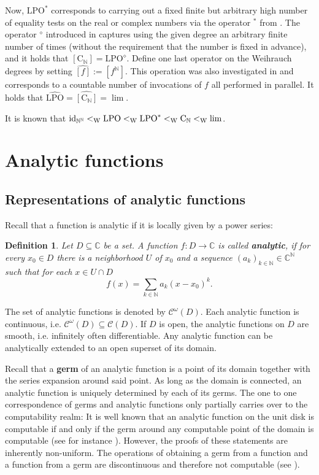 \documentclass{eptcs-modified}
\newtheorem{definition}[theorem]{Definition}
\newcommand{\Wd}[1]{\left[#1\right]}
\newcommand{\id}{\textnormal{id}}
\newcommand{\Baire}{{\mathbb{N}^\mathbb{N}}}
\newcommand{\lpo}{\textrm{LPO}}
\newcommand{\leW}{<_{\textrm{W}}}
\newcommand{\CCN}{\mathrm{C}_{\NN}}
\newcommand{\demph}{\textbf}
\newcommand{\NN}{\mathbb{N}}
\newcommand{\CC}{\mathbb{C}}
\newcommand{\analytic}{\mathcal C^\omega(D)}
\newcommand{\cont}{\mathcal C(D)}
\begin{document}
			Now, $\lpo^*$ corresponds to carrying out a fixed finite but arbitrary high number of equality tests on the real or complex numbers via the operator $^*$ from \cite{paulyreducibilitylattice}.
			The operator $^\diamond$ introduced in \cite{paulyneumann} captures using the given degree an arbitrary finite number of times (without the requirement that the number is fixed in advance), and it holds that $\Wd{\CCN} = \lpo^\diamond$.
			Define one last operator on the Weihrauch degrees by setting $\widehat{\Wd f} := \Wd{f^\NN}$.
			This operation was also investigated in \cite{brattka2} and corresponds to a countable number of invocations of $f$ all performed in parallel.
			It holds that $\widehat{\lpo} = \widehat{\Wd{\CCN}} = \lim$.

			It is known that $\id_\Baire \leW \lpo\leW\lpo^*\leW\CCN \leW \lim$.

	\section{Analytic functions}\label{sec:analytic}
		\subsection{Representations of analytic functions}\label{sec:analytic functions}

			Recall that a function is analytic if it is locally given by a power series:
			\begin{definition}
				Let $D\subseteq \CC$ be a set.
				A function $f:D \to \CC$ is called \demph{analytic}, if for every $x_0\in D$ there is a neighborhood $U$ of $x_0$ and a sequence $(a_k)_{k\in \NN}\in \CC^\NN$ such that for each $x\in U\cap D$
				\[ f(x) = \sum_{k\in \NN} a_k (x-x_0)^k. \]
			\end{definition}
			The set of analytic functions is denoted by $\analytic$.
			Each analytic function is continuous, i.e. $\analytic\subseteq \cont$.
			If $D$ is open, the analytic functions on $D$ are smooth, i.e. infinitely often differentiable.
			Any analytic function can be analytically extended to an open superset of its domain.

			Recall that a \demph{germ} of an analytic function is a point of its domain together with the series expansion around said point.
			As long as the domain is connected, an analytic function is uniquely determined by each of its germs.
			The one to one correspondence of germs and analytic functions only partially carries over to the computability realm:
			It is well known that an analytic function on the unit disk is computable if and only if the germ around any computable point of the domain is computable (see for instance \cite{MR1137517}).
			However, the proofs of these statements are inherently non-uniform.
			The operations of obtaining a germ from a function and a function from a germ are discontinuous and therefore not computable (see \cite{Muller1995}).
\end{document}
